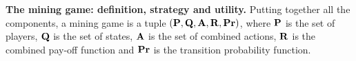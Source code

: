 \smallskip
\noindent
\textbf{The mining game: definition, strategy and utility.}
Putting together all the components,  
a mining game is a tuple $(\mathbf{P},\mathbf{Q},\mathbf{A},\mathbf{R},\mathbf{Pr})$, where $\mathbf{P}$ is the set of players, $\mathbf{Q}$ is the set of states, $\mathbf{A}$ is the set of combined actions, $\mathbf{R}$ is the combined pay-off function 
and $\mathbf{Pr}$ is the transition probability function. 

